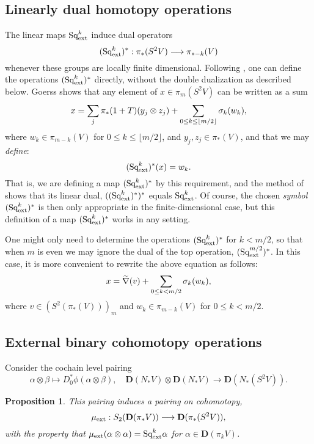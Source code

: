 \documentclass[11pt]{amsart}
\theoremstyle{plain}
\newtheorem{prop}[thm]{Proposition}
\theoremstyle{definition}
\let\oldphi\phi
\let\phi\varphi
\renewcommand{\to}{\longrightarrow}
\newcommand{\calC}{\mathcal{C}}
\theoremstyle{plain}
\newcommand{\ExtCohOp}{\textup{Sq}_\textup{ext}}
\newcommand{\ExtCohProd}{\mu_\textup{ext}}
\newcommand{\dual}{\mathbf{D}}
\begin{document}
\begin{Constructing homotopy and cohomotopy operations}
\subsection{Linearly dual homotopy operations}\label{Linearly dual homotopy operations}
The linear maps $\ExtCohOp^k$ induce dual operators
\[(\ExtCohOp^k)^*:\pi_*(S^2V)\to \pi_{*-k}(V)\]
whenever these groups are locally finite dimensional. Following \cite[\S3]{MR1089001}, one can define the operations $(\ExtCohOp^k)^*$ directly, without the double dualization as described below. %
Goerss \cite[Proposition 3.7]{MR1089001}
shows that any element of $x\in \pi_m(S^2V)$ can be written as a sum
\[x=\sum_j\pi_*(1+T)(y_j\otimes z_j)+\sum_{\smash{0\leq k\leq \lfloor m/2\rfloor}}\sigma_k(w_k),\]
where $w_k\in \pi_{m-k}(V)$ for $0\leq k\leq\lfloor m/2\rfloor$, and $y_j,z_j\in \pi_{*}(V)$, and that we may \emph{define}:
\[(\ExtCohOp^k)^*(x)=w_k.\]
That is, we are defining a map $(\ExtCohOp^k)^*$ by this requirement, and the method of \cite[\S3]{MR1089001} shows that its linear dual, $((\ExtCohOp^k)^*)^*$ equals $\ExtCohOp^k$. Of course, the chosen \emph{symbol} $(\ExtCohOp^k)^*$ is then only appropriate in the finite-dimensional case, but this definition of a map $(\ExtCohOp^k)^*$ works in any setting.

One might only need to determine the operations $(\ExtCohOp^k)^*$ for $k<m/2$, so that when $m$ is even we may ignore the dual of the top operation, $(\ExtCohOp^{m/2})^*$. In this case, it is more convenient to rewrite the above equation as follows: 
\[x=\widetilde{\nabla}(v)+\sum_{\smash{0\leq k< m/2}}\sigma_k(w_k),\]
where $v\in(S^2(\pi_*(V)))_{m}$ and $w_k\in \pi_{m-k}(V)$ for $0\leq k<m/2$.


\subsection{External binary cohomotopy operations}
Consider the cochain level pairing
\[\alpha\otimes\beta\mapsto D_0^*\oldphi(\alpha\otimes\beta),\quad\dual(N_*V)\otimes \dual(N_*V)\to \dual(N_*(S^2V)).\]
\begin{prop}\label{the external cohomotopy pairing}
This pairing induces a pairing on cohomotopy,
\[\ExtCohProd:S_2(\dual(\pi_*V))\to \dual(\pi_*(S^2V)),\]
with the property that $\ExtCohProd(\alpha\otimes \alpha)=\ExtCohOp^k\alpha$ for $\alpha\in\dual(\pi_kV)$.
\end{prop}




\end{Constructing homotopy and cohomotopy operations}
\end{document}
